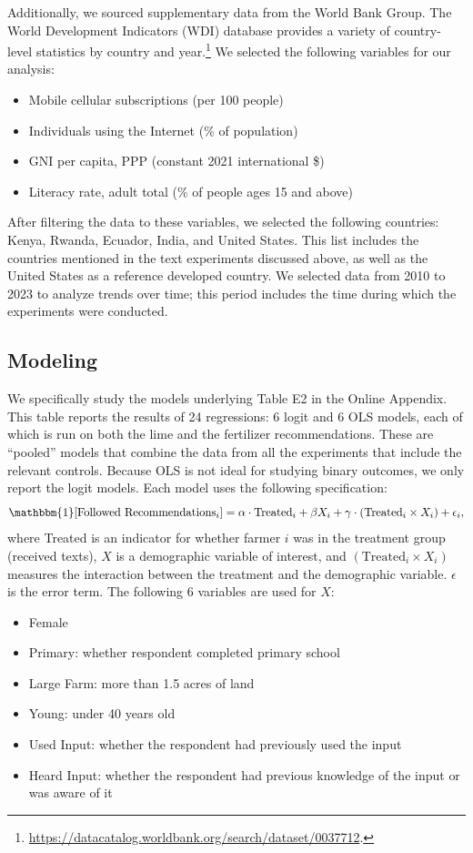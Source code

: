 \documentclass[12pt]{article}
\begin{document}
Additionally, we sourced supplementary data from the World Bank Group. The World Development Indicators (WDI) database provides a variety of country-level statistics by country and year.\footnote{\url{https://datacatalog.worldbank.org/search/dataset/0037712}.} We selected the following variables for our analysis:
\begin{itemize}
    \singlespacing
    \item Mobile cellular subscriptions (per 100 people)
    \item Individuals using the Internet (\% of population)
    \item GNI per capita, PPP (constant 2021 international \$)
    \item Literacy rate, adult total (\% of people ages 15 and above)
\end{itemize}
After filtering the data to these variables, we selected the following countries: Kenya, Rwanda, Ecuador, India, and United States. This list includes the countries mentioned in the text experiments discussed above, as well as the United States as a reference developed country. We selected data from 2010 to 2023 to analyze trends over time; this period includes the time during which the \textcite{fabregas_digital_2025} experiments were conducted.

\subsection{Modeling}
We specifically study the models underlying Table E2 in the \textcite{fabregas_digital_2025} Online Appendix. This table reports the results of 24 regressions: 6 logit and 6 OLS models, each of which is run on both the lime and the fertilizer recommendations. These are ``pooled'' models that combine the data from all the experiments that include the relevant controls. Because OLS is not ideal for studying binary outcomes, we only report the logit models. Each model uses the following specification:
\begin{equation}
    \mathbbm{1}[\text{Followed Recommendations}_i] = \alpha \cdot \text{Treated}_i + \beta X_i + \gamma \cdot (\text{Treated}_i \times X_i) + \epsilon_i,
\end{equation}
where Treated is an indicator for whether farmer $i$ was in the treatment group (received texts), $X$ is a demographic variable of interest, and $(\text{Treated}_i \times X_i)$ measures the interaction between the treatment and the demographic variable. $\epsilon$ is the error term. The following 6 variables are used for $X$:
\begin{itemize}
    \singlespacing
    \item Female
    \item Primary: whether respondent completed primary school
    \item Large Farm: more than 1.5 acres of land
    \item Young: under 40 years old
    \item Used Input: whether the respondent had previously used the input
    \item Heard Input: whether the respondent had previous knowledge of the input or was aware of it
\end{itemize}
\end{document}
